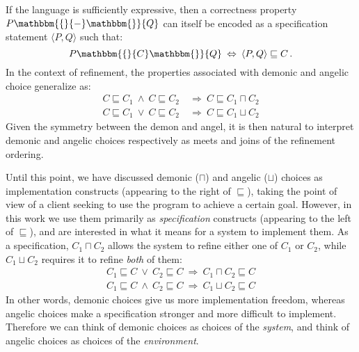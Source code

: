\documentclass[draft,11pt]{report}
\newcommand{\htr}[3]{{ {#1} \mathbbm{\{} {#2} \mathbbm{\}} {#3} }}
\begin{document}
If the language is sufficiently expressive,
then a correctness property $\htr{P}{-}{Q}$
can itself be encoded \cite{specstm} as
a specification statement $\langle{}P,Q{}\rangle$
such that:
\[
    \htr{P}{C}{Q} \: \Leftrightarrow \:
    \langle{}P,Q{}\rangle \sqsubseteq C \,.
\]
In the context of refinement,
the properties associated with demonic and angelic choice
generalize as:
\begin{align*}
  C \sqsubseteq C_1 \:\wedge\: C \sqsubseteq C_2 &
    \:\Rightarrow\: C \sqsubseteq C_1 \sqcap C_2 \\
  C \sqsubseteq C_1 \:\vee\: C \sqsubseteq C_2 &
    \:\Rightarrow\: C \sqsubseteq C_1 \sqcup C_2
\end{align*}
Given the symmetry between the demon and angel,
it is then natural to interpret demonic and angelic choices
respectively as meets and joins
of the refinement ordering.

Until this point,
we have discussed demonic ($\sqcap$) and angelic ($\sqcup$) choices
as implementation constructs
(appearing to the right of $\sqsubseteq$),
taking the point of view of a client
seeking to use the program to achieve a certain goal.
However,
in this work we use them primarily
as \emph{specification} constructs
(appearing to the left of $\sqsubseteq$),
and are interested in what it means
for a system to implement them.
%
As a specification, $C_1 \sqcap C_2$
allows the system to refine either one of $C_1$ or $C_2$, while
$C_1 \sqcup C_2$ requires it to refine
\emph{both} of them:
\begin{gather*}
  C_1 \sqsubseteq C \: \vee \: C_2 \sqsubseteq C
    \: \Rightarrow \: C_1 \sqcap C_2 \sqsubseteq C \\
  C_1 \sqsubseteq C \: \wedge \: C_2 \sqsubseteq C
    \: \Rightarrow \: C_1 \sqcup C_2 \sqsubseteq C 
\end{gather*}
In other words,
demonic choices
give us more
implementation freedom,
whereas angelic choices make a specification
stronger and more difficult to implement.
Therefore we can think of demonic choices as
choices of the \emph{system}, %
and think of angelic choices as
choices of the \emph{environment}.
\end{document}
